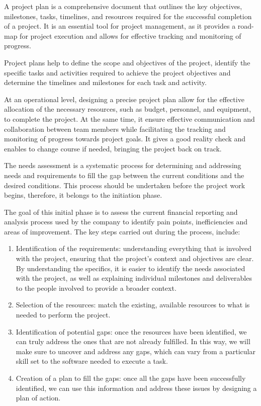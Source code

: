 \documentclass[12pt,a4paper,openright,twoside]{book}
\begin{document}
A project plan is a comprehensive document that outlines the key objectives, milestones, tasks, timelines, and resources required for the successful completion of a project. 
%
It is an essential tool for project management, as it provides a road-map for project execution and allows for effective tracking and monitoring of progress.

Project plans help to define the scope and objectives of the project, identify the specific tasks and activities required to achieve the project objectives and determine the timelines and milestones for each task and activity.

At an operational level, designing a precise project plan allow for the effective allocation of the necessary resources, such as budget, personnel, and equipment, to complete the project.
%
At the same time, it ensure effective communication and collaboration between team members while facilitating the tracking and monitoring of progress towards project goals.
%
It gives a good reality check and enables to change course if needed, bringing the project back on track. 

The needs assessment is a systematic process for determining and addressing needs and requirements to fill the gap between the current conditions and the desired conditions.
%
This process should be undertaken before the project work begins, therefore, it belongs to the initiation phase.

The goal of this initial phase is to assess the current financial reporting and analysis process used by the company to identify pain points, inefficiencies and areas of improvement.
%
The key steps carried out during the process, include:

\begin{enumerate}
    \item Identification of the requirements: understanding everything that is involved with the project, ensuring that the project’s context and objectives are clear. By understanding the specifics, it is easier to identify the needs associated with the project, as well as explaining individual milestones and deliverables to the people involved to provide a broader context.
    \item Selection of the resources: match the existing, available resources to what is needed to perform the project. 
    \item Identification of potential gaps: once the resources have been identified, we can truly address the ones that are not already fulfilled. In this way, we will make sure to uncover and address any gaps, which can vary from a particular skill set to the software needed to execute a task. 
    \item Creation of a plan to fill the gaps: once all the gaps have been successfully identified, we can use this information and address these issues by designing a plan of action. 
\end{enumerate}
\end{document}
